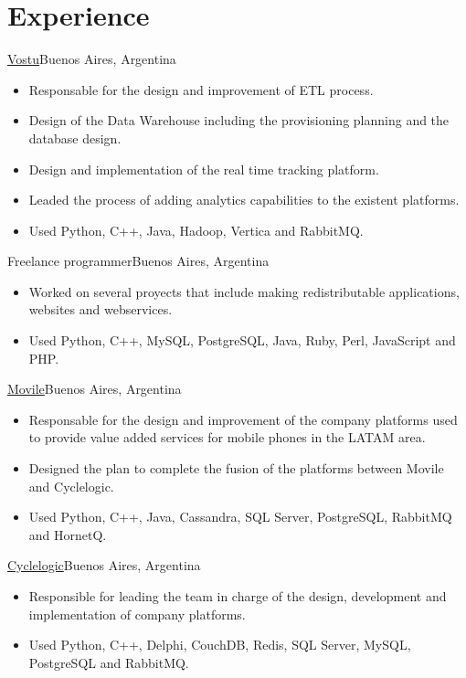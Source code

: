 \documentclass[a4paper,11pt]{moderncv}
\newcommand\weblink[2] {{\color{href} \href{#1}{#2}}}
\begin{document}
\pagebreak

\section{Experience}
{\weblink{http://www.vostu.com}{Vostu}}{Buenos Aires, Argentina}{}{%
\begin{itemize}
  \item Responsable for the design and improvement of ETL process.
  \item Design of the Data Warehouse including the provisioning planning and
  the database design.
  \item Design and implementation of the real time tracking platform.
  \item Leaded the process of adding analytics capabilities to the existent
  platforms.
  \item Used Python, C++, Java, Hadoop, Vertica and RabbitMQ.
\end{itemize}
}
%
{Freelance programmer}{Buenos Aires, Argentina}{}{%
\begin{itemize}
  \item Worked on several proyects that include making redistributable
  applications, websites and webservices.
  \item Used Python, C++, MySQL, PostgreSQL, Java, Ruby, Perl, JavaScript and
  PHP.
\end{itemize}
}
%
{\weblink{http://www.movile.com}{Movile}}{Buenos Aires, Argentina}{}{%
\begin{itemize}
  \item Responsable for the design and improvement of the company platforms
  used to provide value added services for mobile phones in the LATAM area.
  \item Designed the plan to complete the fusion of the platforms between
  Movile and Cyclelogic.
  \item Used Python, C++, Java, Cassandra, SQL Server, PostgreSQL, RabbitMQ and
  HornetQ.
\end{itemize}
}
%
{\weblink{http://www.cyclelogic.com}{Cyclelogic}}{Buenos Aires, Argentina}{}{%
\begin{itemize}
  \item Responsible for leading the team in charge of the design, development
  and implementation of company platforms.
  \item Used Python, C++, Delphi, CouchDB, Redis, SQL Server, MySQL, PostgreSQL
  and RabbitMQ.
\end{itemize}
}
\end{document}
